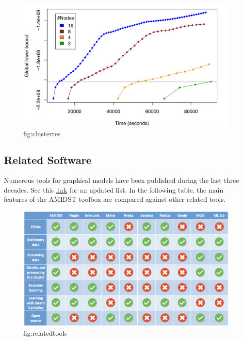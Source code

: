 \documentclass[10pt,a4paper]{article}
\begin{document}
\begin{figure}[h!]
	\centering
	\includegraphics[width=15cm]{img/cluster_res.png}
		\caption{fig:clusterres}
\end{figure}


	\subsection{Related Software}
	
	

Numerous tools for graphical models have been published during the last three decades. See this \href{http://www.cs.ubc.ca/~murphyk/Software/bnsoft.html}{link} for an updated list. In the following table, the main features of the AMIDST toolbox are compared against other related tools.




\begin{figure}[h!]
	\centering
	\includegraphics[width=15cm]{img/related_tools.png}
		\caption{fig:relatedtools}
\end{figure}
\end{document}
